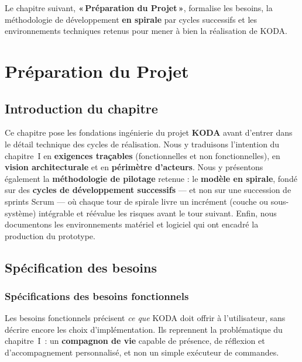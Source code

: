 \documentclass[a4paper,12pt]{report}
\begin{document}
Le chapitre suivant, \textbf{«\,Préparation du Projet\,»}, formalise les besoins, la méthodologie de développement \textbf{en spirale} par cycles successifs et les environnements techniques retenus pour mener à bien la réalisation de KODA.
	
	
	\chapter{Préparation du Projet}
	
	\section{Introduction du chapitre}
	
	Ce chapitre pose les fondations ingénierie du projet \textbf{KODA} avant d'entrer dans
	le détail technique des cycles de réalisation. Nous y traduisons l'intention du
	chapitre~I en \textbf{exigences traçables} (fonctionnelles et non fonctionnelles),
	en \textbf{vision architecturale} et en \textbf{périmètre d'acteurs}. Nous y
	présentons également la \textbf{méthodologie de pilotage} retenue : le \textbf{modèle
	en spirale}, fondé sur des \textbf{cycles de développement successifs} —
	et non sur une succession de sprints Scrum — où chaque tour de spirale livre un
	incrément (couche ou sous-système) intégrable et réévalue les risques avant le tour
	suivant. Enfin, nous documentons les environnements matériel et logiciel qui ont
	encadré la production du prototype.
	
	\section{Spécification des besoins}
	
	\subsection{Spécifications des besoins fonctionnels}
	
	Les besoins fonctionnels précisent \textit{ce que} KODA doit offrir à l'utilisateur,
	sans décrire encore les choix d'implémentation. Ils reprennent la problématique du
	chapitre~I~: un \textbf{compagnon de vie} capable de présence, de réflexion et
	d'accompagnement personnalisé, et non un simple exécuteur de commandes.
	
\end{document}
